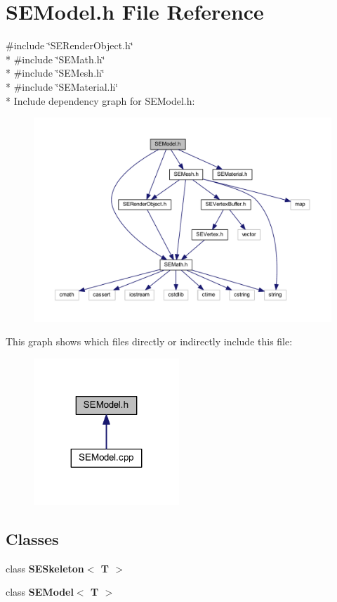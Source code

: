 \section{S\+E\+Model.\+h File Reference}
\label{_s_e_model_8h}
{\ttfamily \#include \char`\"{}S\+E\+Render\+Object.\+h\char`\"{}}\\*
{\ttfamily \#include \char`\"{}S\+E\+Math.\+h\char`\"{}}\\*
{\ttfamily \#include \char`\"{}S\+E\+Mesh.\+h\char`\"{}}\\*
{\ttfamily \#include \char`\"{}S\+E\+Material.\+h\char`\"{}}\\*
Include dependency graph for S\+E\+Model.\+h\+:
\nopagebreak
\begin{figure}[H]
\begin{center}
\leavevmode
\includegraphics[width=350pt]{_s_e_model_8h__incl}
\end{center}
\end{figure}
This graph shows which files directly or indirectly include this file\+:
\nopagebreak
\begin{figure}[H]
\begin{center}
\leavevmode
\includegraphics[width=155pt]{_s_e_model_8h__dep__incl}
\end{center}
\end{figure}
\subsection*{Classes}
\begin{DoxyCompactItemize}
\item 
class {\bf S\+E\+Skeleton$<$ T $>$}
\item 
class {\bf S\+E\+Model$<$ T $>$}
\end{DoxyCompactItemize}
